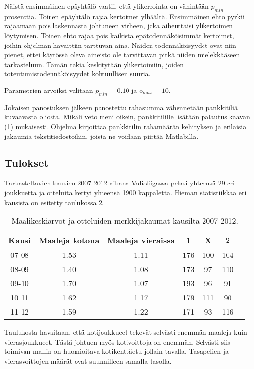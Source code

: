 \documentclass[a4paper,finnish,titlepage,12pt]{article}
\begin{document}
Näistä ensimmäinen epäyhtälö vaatii, että ylikerrointa on vähintään $p_{min}$ prosenttia.
Toinen epäyhtälö rajaa kertoimet ylhäältä.
Ensimmäinen ehto pyrkii rajaamaan pois laskennasta johtuneen virheen, joka aiheuttaisi ylikertoimen löytymisen.
Toinen ehto rajaa pois kaikista epätodennäköisimmät kertoimet, joihin ohjelman havaittiin tarttuvan aina.
Näiden todennäköisyydet ovat niin pienet, ettei käytössä oleva aineisto ole tarvittavan pitkä niiden mielekkääseen tarkasteluun.
Tämän takia keskitytään ylikertoimiin, joiden toteutumistodennäköisyydet kohtuullisen suuria.

Parametrien arvoiksi valitaan $p_{min} = 0.10$ ja $o_{max} = 10$.


Jokaisen panostuksen jälkeen panostettu rahasumma vähennetään pankkitiliä kuvaavasta oliosta. Mikäli veto meni oikein, pankkitilille lisätään palautus kaavan (1) mukaisesti. Ohjelma kirjoittaa pankkitilin rahamäärän kehityksen ja erilaisia jakaumia tekstitiedostoihin, joista ne voidaan piirtää Matlabilla.


\subsection{Tulokset}
Tarkasteltavien kausien 2007-2012 aikana Valioliigassa pelasi yhteensä 29 eri joukkuetta ja otteluita kertyi yhteensä 1900 kappaletta. Hieman statistiikkaa eri kausista on esitetty taulukossa 2.

\begin{table}[h!]
    \caption{Maalikeskiarvot ja otteluiden merkkijakaumat kausilta 2007-2012.}
    \begin{center}
    \begin{tabular}{c|c|c|c|c|c|c}
        \hline
	Kausi  & Maaleja kotona & Maaleja vieraissa & 1 & X & 2 \\ \hline
	07-08 & 1.53 & 1.11 & 176 & 100 & 104 \\
	08-09 & 1.40 & 1.08 & 173 & 97 & 110 \\
	09-10 & 1.70 & 1.07 & 193 & 96 & 91 \\
	10-11 & 1.62 & 1.17 & 179 & 111 & 90 \\
	11-12 & 1.59 & 1.22 & 171 & 93 & 116 \\
        \hline
    \end{tabular}
    \end{center}
\end{table}

Taulukosta havaitaan, että kotijoukkueet tekevät selvästi enemmän maaleja kuin vierasjoukkueet. Tästä johtuen myös kotivoittoja on enemmän. Selvästi siis toimivan mallin on huomioitava kotikenttäetu jollain tavalla. Tasapelien ja vierasvoittojen määrät ovat suunnilleen samalla tasolla.
\end{document}
